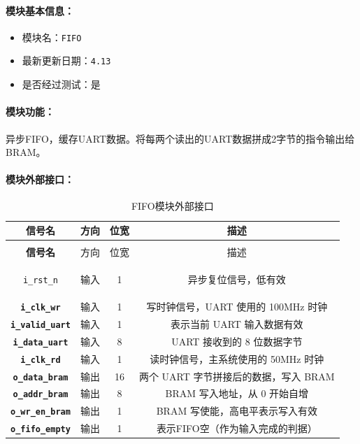 \documentclass[lang=cn,a4paper,newtx]{elegantpaper}
\begin{document}
\paragraph{模块基本信息：}
\begin{itemize}
  \item 模块名：\texttt{FIFO}
  \item 最新更新日期：\texttt{4.13}
  \item 是否经过测试：是
\end{itemize}
\paragraph{模块功能：}
异步FIFO，缓存UART数据。将每两个读出的UART数据拼成2字节的指令输出给BRAM。
\paragraph{模块外部接口：}
\begin{longtable}{>{\bfseries}c c c c}
  \caption{FIFO模块外部接口} \\
  \toprule
  信号名 & 方向 & 位宽 & 描述 \\
  \midrule
  \endfirsthead

  \multicolumn{4}{l}{\textbf{（续表）FIFO模块外部接口}} \\
  \toprule
  信号名 & 方向 & 位宽 & 描述 \\
  \midrule
  \endhead

  \texttt{i\_rst\_n}         & 输入  & 1        & 异步复位信号，低有效 \\
  \texttt{i\_clk\_wr}        & 输入  & 1        & 写时钟信号，UART 使用的 100MHz 时钟 \\
  \texttt{i\_valid\_uart}    & 输入  & 1        & 表示当前 UART 输入数据有效 \\
  \texttt{i\_data\_uart}     & 输入  & 8        & UART 接收到的 8 位数据字节 \\
  \texttt{i\_clk\_rd}        & 输入  & 1        & 读时钟信号，主系统使用的 50MHz 时钟 \\
  \texttt{o\_data\_bram}     & 输出  & 16       & 两个 UART 字节拼接后的数据，写入 BRAM \\
  \texttt{o\_addr\_bram}     & 输出  & 8        & BRAM 写入地址，从 0 开始自增 \\
  \texttt{o\_wr\_en\_bram}   & 输出  & 1        & BRAM 写使能，高电平表示写入有效 \\
  \texttt{o\_fifo\_empty}    & 输出   & 1       & 表示FIFO空（作为输入完成的判据）\\
  \bottomrule
\end{longtable}
\end{document}
